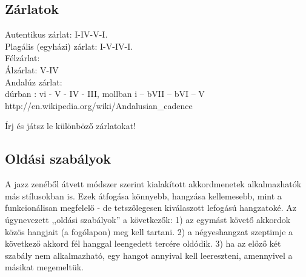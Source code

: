 \subsection{Zárlatok}
\label{sec:zarlatok}
Autentikus zárlat: I-IV-V-I. \\
Plagális (egyházi) zárlat: I-V-IV-I. \\
Félzárlat: \\
Álzárlat: V-IV \\
Andalúz zárlat: \\
dúrban : vi - V - IV - III, mollban i – bVII – bVI – V \\
http://en.wikipedia.org/wiki/Andalusian\_cadence
\begin{practices}
\item Írj és játsz le különböző zárlatokat!
\end{practices}
\subsection{Oldási szabályok}
\label{sec:oldasiszabalyok}
A jazz zenéből átvett módszer szerint kialakított akkordmenetek alkalmazhatók más stílusokban is. Ezek átfogása könnyebb, hangzása kellemesebb, mint a funkcionálisan megfelelő - de tetszőlegesen kiválaszott lefogású hangzatoké. Az úgynevezett ,,oldási szabályok'' a következők:
1) az egymást követő akkordok közös hangjait (a fogólapon) meg kell tartani.
2) a négyeshangzat szeptimje a következő akkord fél hanggal leengedett tercére oldódik.
3) ha az előző két szabály nem alkalmazható, egy hangot annyival kell leereszteni, amennyivel a másikat megemeltük.

